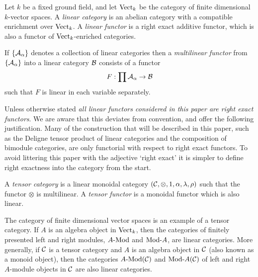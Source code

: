\documentclass{amsart}
\begin{document}
	Let $k$ be a fixed ground field, and let $\mathrm{Vect}_k$ be the category of finite dimensional $k$-vector spaces.   A {\em linear category} is an abelian category with a compatible enrichment over ${\mathrm{Vect}}_k$.  A {\em linear functor} is a right exact additive functor, which is also a functor of ${\mathrm{Vect}}_k$-enriched categories. 
	
If $\{\mathcal A_\alpha\}$ denotes a collection of linear categories then a {\em multilinear functor} from $\{\mathcal A_\alpha\}$ into a linear category $\mathcal B$ consists of a functor
\begin{equation*}
	F: \prod \mathcal A_\alpha \to \mathcal B
\end{equation*}
such that $F$ is linear in each variable separately. 

\begin{warning}
	Unless otherwise stated {\em all linear functors considered in this paper are right exact functors}.  We are aware that this deviates from convention, and offer the following justification. Many of the construction that will be described in this paper, such as the Deligne tensor product of linear categories and the composition of bimodule categories, are only functorial with respect to right exact functors. To avoid littering this paper with the adjective `right exact' it is simpler to define right exactness into the category from the start.  
\end{warning} 

\begin{definition}
	A {\em tensor category} is a linear monoidal category $(\mathcal C, \otimes, 1, \alpha, \lambda, \rho)$ such that the functor $\otimes$ is multilinear. A {\em tensor functor} is a monoidal functor which is also linear.
\end{definition}

\begin{example}
	The category of finite dimensional vector spaces is an example of a tensor category. If $A$ is an algebra object in $\mathrm{Vect}_k$, then the categories of finitely presented left and right modules, $\Mod{A}{}$ and $\Mod{}{A}$, are linear categories. More generally, if $\mathcal C$ is a tensor category and $A$ is an algebra object in $\mathcal C$ (also known as a monoid object), then the categories $\Mod{A}{}(\cC)$ and $\Mod{}{A}(\cC)$ of left and right $A$-module objects in $\mathcal C$ are also linear categories.
\end{example}
\end{document}
